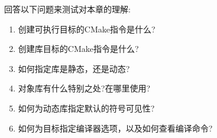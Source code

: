 回答以下问题来测试对本章的理解:

\begin{enumerate}
\item 
创建可执行目标的CMake指令是什么?
	
\item 
创建库目标的CMake指令是什么?

\item 
如何指定库是静态，还是动态?

\item 
对象库有什么特别之处?在哪里使用?

\item 
如何为动态库指定默认的符号可见性?

\item 
如何为目标指定编译器选项，以及如何查看编译命令?
\end{enumerate}